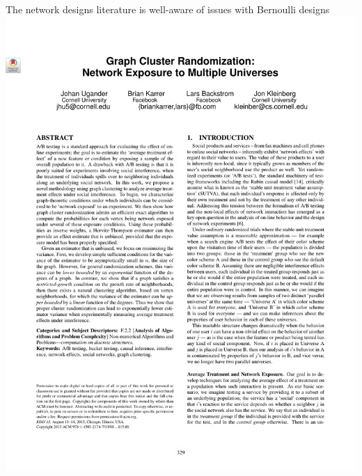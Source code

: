 \documentclass[aspectratio=169]{beamer}
\theoremstyle{remark}
\begin{document}


\begin{frame}{The network designs literature is well-aware of issues with Bernoulli designs}
    \vfill
    \centering
    \includegraphics[height=0.9\textheight, page=1, trim={1.5cm 8.5cm 0 2cm}, clip]{./papers/gcr.pdf}
\end{frame}
\end{document}
